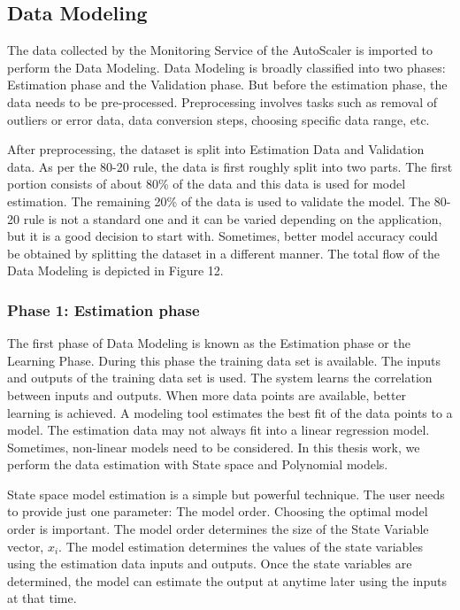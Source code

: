 \documentclass[article,type=msc,colorback,12pt,accentcolor=tud7b,table]{tudthesis}
\begin{document}
 	\subsection{Data Modeling}
 	
 	The data collected by the Monitoring Service of the AutoScaler is imported to perform the Data Modeling. Data Modeling is broadly classified into two phases: Estimation phase and the Validation phase. But before the estimation phase, the data needs to be pre-processed. Preprocessing involves tasks such as removal of outliers or error data, data conversion steps, choosing specific data range, etc. 
 	
 	After preprocessing, the dataset is split into Estimation Data and Validation data. As per the 80-20 rule, the data is first roughly split into two parts. The first portion consists of about 80\% of the data and this data is used for model estimation. The remaining 20\% of the data is used to validate the model. The 80-20 rule is not a standard one and it can be varied depending on the application, but it is a good decision to start with. Sometimes, better model accuracy could be obtained by splitting the dataset in a different manner. The total flow of the Data Modeling is depicted in Figure 12.
 	
 	\subsubsection{Phase 1: Estimation phase}
 	
 	The first phase of Data Modeling is known as the Estimation phase or the Learning Phase. During this phase the training data set is available. The inputs and outputs of the training data set is used. The system learns the correlation between inputs and outputs. When more data points are available, better learning is achieved. A modeling tool estimates the best fit of the data points to a model. The estimation data may not always fit into a linear regression model. Sometimes, non-linear models need to be considered. In this thesis work, we perform the data estimation with State space and Polynomial models.
 	
 	State space model estimation is a simple but powerful technique. The user needs to provide just one parameter: The model order. Choosing the optimal model order is important. The model order determines the size of the State Variable vector, $x_i$. The model estimation determines the values of the state variables using the estimation data inputs and outputs. Once the state variables are determined, the model can estimate the output at anytime later using the inputs at that time.
\end{document}
